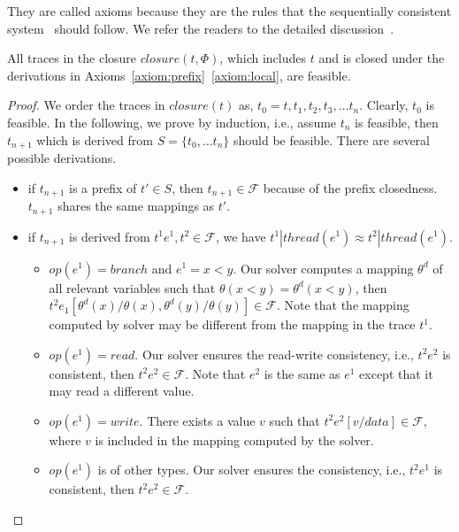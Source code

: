 


They are called axioms because they are the rules that the sequentially consistent system~\cite{maximal} should follow.
We refer the readers to the detailed discussion~\cite{maximal, pldi14}.



\begin{mytheorem}[Soundness]
All traces in the closure $closure(t, \Phi)$, which includes $t$ and is closed under the derivations in Axioms~\ref{axiom:prefix}~\ref{axiom:local}, are feasible.
\end{mytheorem}

\begin{proof}
We order the traces in $closure(t)$ as, $t_0=t, t_1, t_2, t_3, \dots t_n$. Clearly, $t_0$ is feasible. In the following, we prove by induction, i.e., assume $t_{n}$ is feasible, then $t_{n+1}$ which is derived from $S=\{t_0, \dots t_n\}$ should be feasible. There are several possible derivations.
\begin{itemize}
\item if $t_{n+1}$ is a prefix of $t'\in S$, then $t_{n+1}\in\mathcal{F}$ because of the prefix closedness. $t_{n+1}$ shares the same mappings as $t'$.
\item if $t_{n+1}$ is derived from $t^1 e^1, t^2\in \mathcal{F}$, we have $t^1|thread(e^1)\approx t^2|thread(e^1)$.
\begin{itemize}
\item $op(e^1)=branch$ and $e^1= x<y$. Our solver computes a mapping $\theta^d$ of all relevant variables such that $\theta(x<y)=\theta^d(x<y)$, then 
$t^2 e_1[\theta^d(x)/\theta(x),\theta^d(y)/\theta(y) ]  \in \mathcal{F}$. Note that the mapping computed by solver may be different from the mapping in the trace $t^1$.
\item $op(e^1)=read$. Our solver ensures the read-write consistency, i.e., $t^2 e^2$ is consistent, then $t^2 e^2 \in \mathcal{F}$. Note that $e^2$ is the same as $e^1$ except that it may read a different value.
\item $op(e^1)=write$. There exists a value $v$ such that $t^2 e^2[v/data]\in \mathcal{F}$, where $v$ is included in the mapping computed by the solver. 
\item $op(e^1)$ is of other types. Our solver ensures the consistency, i.e., $t^2 e^1$ is consistent, then $t^2 e^2 \in \mathcal{F}$.
\end{itemize}
\end{itemize}
\end{proof}



